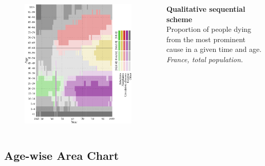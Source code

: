 \documentclass{beamer}
\begin{document}
\begin{frame}
\frametitle{\insertsection}

\begin{columns}[c]

\begin{figure}[htb!]
\includegraphics[width = 0.97\textwidth]{../fig/plot-qual_seq.pdf}
\end{figure}

\footnotesize \textbf{Qualitative sequential scheme}\\ Proportion of people dying from the most prominent cause in a given time and age. \scriptsize\emph{France, total population.}

\end{columns}

\end{frame}

%

\subsection{Age-wise Area Chart}
\end{document}

